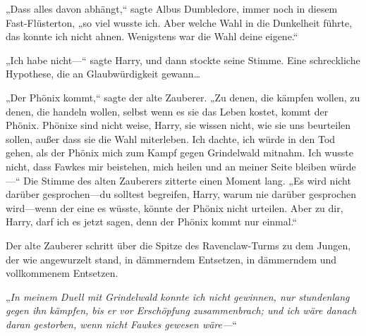„Dass alles davon abhängt,“ sagte Albus Dumbledore, immer noch in diesem Fast-Flüsterton, „so viel wusste ich. Aber welche Wahl in die Dunkelheit führte, das konnte ich nicht ahnen. Wenigstens war die Wahl deine eigene.“

„Ich habe nicht—“ sagte Harry, und dann stockte seine Stimme.
Eine schreckliche Hypothese, die an Glaubwürdigkeit gewann…

„Der Phönix kommt,“ sagte der alte Zauberer. „Zu denen, die kämpfen wollen, zu denen, die handeln wollen, selbst wenn es sie das Leben kostet, kommt der Phönix. Phönixe sind nicht weise, Harry, sie wissen nicht, wie sie uns beurteilen sollen, außer dass sie die Wahl miterleben. Ich dachte, ich würde in den Tod gehen, als der Phönix mich zum Kampf gegen Grindelwald mitnahm. Ich wusste nicht, dass Fawkes mir beistehen, mich heilen und an meiner Seite bleiben würde—“
Die Stimme des alten Zauberers zitterte einen Moment lang.
„Es wird nicht darüber gesprochen—du solltest begreifen, Harry, warum nie darüber gesprochen wird—wenn der eine es wüsste, könnte der Phönix nicht urteilen. Aber zu dir, Harry, darf ich es jetzt sagen, denn der Phönix kommt nur einmal.“

Der alte Zauberer schritt über die Spitze des Ravenclaw-Turms zu dem Jungen, der wie angewurzelt stand, in dämmerndem Entsetzen, in dämmerndem und vollkommenem Entsetzen.

„\emph{In meinem Duell mit Grindelwald konnte ich nicht gewinnen, nur stundenlang gegen ihn kämpfen, bis er vor Erschöpfung zusammenbrach; und ich wäre danach daran gestorben, wenn nicht Fawkes gewesen wäre—}“

